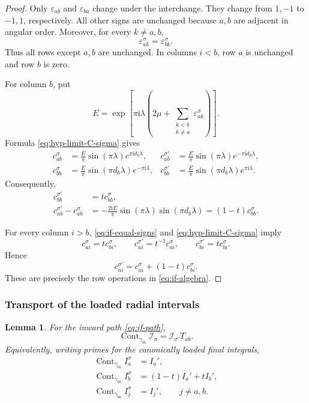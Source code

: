 \documentclass[12pt]{amsart}
\newtheorem{lem}[thm]{Lemma}
\theoremstyle{definition}
\numberwithin{equation}{section}
\theoremstyle{definition}
\let\mc\mathcal
\let\eps\varepsilon
\let\gm\gamma
\let\la\lambda
\let\si\sigma
\def\beq{\begin{equation}}
\def\eeq{\end{equation}}
\begin{document}
\begin{proof}
Only $\eps_{ab}$ and $\eps_{ba}$ change under the interchange.
They change from $1,-1$ to $-1,1$, respectively. All other signs
are unchanged because $a,b$ are adjacent in angular order.
Moreover, for every $k\ne a,b$,
\beq\label{eq:if-equal-signs}
 \eps_{ak}^\si=\eps_{bk}^\si.
\eeq
Thus all rows except $a,b$ are unchanged. In columns $i<b$,
row $a$ is unchanged and row $b$ is zero.

For column $b$, put
\beq
 E=\exp\!\left[\pi\mathrm{i}\la\left(
 2\mu+\sum_{\substack{k<b\\k\ne a}}\eps_{ak}^\si\right)\right].
\eeq
Formula \eqref{eq:hyp-limit-C-sigma} gives
\beq\label{eq:if-column-b}
 \begin{aligned}
 c_{ab}^\si&=\frac{E}{\pi}\sin(\pi\la)e^{\pi\mathrm{i}d_b\la},
 &c_{ab}^{\si'}&=\frac{E}{\pi}\sin(\pi\la)e^{-\pi\mathrm{i}d_b\la},\\
 c_{bb}^\si&=\frac{E}{\pi}\sin(\pi d_b\la)e^{-\pi\mathrm{i}\la},
 &c_{bb}^{\si'}&=\frac{E}{\pi}\sin(\pi d_b\la)e^{\pi\mathrm{i}\la}.
 \end{aligned}
\eeq
Consequently,
\beq
 \begin{aligned}
 c_{bb}^{\si'}&=t c_{bb}^\si,\\
 c_{ab}^{\si'}-c_{ab}^\si
 &=-\frac{2\mathrm{i}E}{\pi}\sin(\pi\la)\sin(\pi d_b\la)
   =(1-t)c_{bb}^\si.
 \end{aligned}
\eeq

For every column $i>b$, \eqref{eq:if-equal-signs} and
\eqref{eq:hyp-limit-C-sigma} imply
\beq
 c_{ai}^\si=t c_{bi}^\si,\qquad
 c_{ai}^{\si'}=t^{-1}c_{ai}^\si,\qquad
 c_{bi}^{\si'}=t c_{bi}^\si.
\eeq
Hence
\beq
 c_{ai}^{\si'}=c_{ai}^\si+(1-t)c_{bi}^\si.
\eeq
\nopagebreak[4]
These are precisely the row operations in \eqref{eq:if-algebra}.
\end{proof}

\subsubsection{Transport of the loaded radial intervals}

\begin{lem}\label{lem:if-topology}
For the inward path \eqref{eq:if-path},
\beq\label{eq:if-topology}
 \operatorname{Cont}_{\gm_{\mathrm{in}}}\mc I_\si
 =\mc I_{\si'}T_{ab}.
\eeq
Equivalently, writing primes for the canonically loaded final integrals,
\beq\label{eq:if-path-components}
 \begin{aligned}
 \operatorname{Cont}_{\gm_{\mathrm{in}}}I_a^\si&=I_a',\\
 \operatorname{Cont}_{\gm_{\mathrm{in}}}I_b^\si&=(1-t)I_a'+tI_b',\\
 \operatorname{Cont}_{\gm_{\mathrm{in}}}I_j^\si&=I_j',\qquad j\ne a,b.
 \end{aligned}
\eeq
\end{lem}
\end{document}
